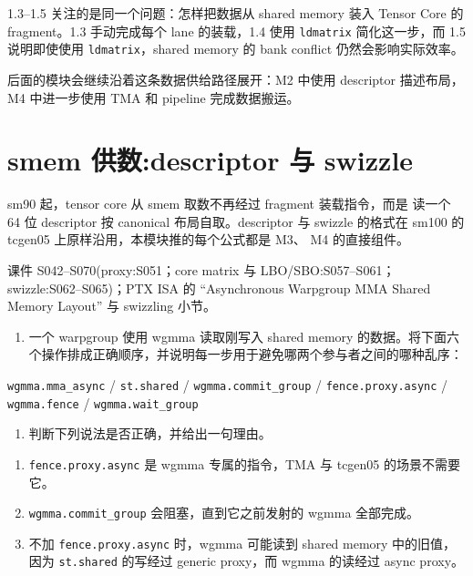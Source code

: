 \documentclass[11pt,a4paper,fontset=fandol]{ctexart}
\providecommand{\tightlist}{\setlength{\itemsep}{0pt}\setlength{\parskip}{0pt}}
\begin{document}
\begin{lookback}

1.3--1.5 关注的是同一个问题：怎样把数据从 shared memory 装入 Tensor Core
的 fragment。1.3 手动完成每个 lane 的装载，1.4 使用 \texttt{ldmatrix}
简化这一步，而 1.5 说明即使使用 \texttt{ldmatrix}，shared memory 的 bank
conflict 仍然会影响实际效率。

后面的模块会继续沿着这条数据供给路径展开：M2 中使用 descriptor
描述布局，M4 中进一步使用 TMA 和 pipeline 完成数据搬运。

\end{lookback}

\section{smem 供数:descriptor 与
swizzle}\label{smem-ux4f9bux6570descriptor-ux4e0e-swizzle}

sm90 起，tensor core 从 smem 取数不再经过 fragment 装载指令，而是 读一个
64 位 descriptor 按 canonical 布局自取。descriptor 与 swizzle 的格式在
sm100 的 tcgen05 上原样沿用，本模块推的每个公式都是 M3、 M4 的直接组件。

\begin{reading}

课件 S042--S070(proxy:S051；core matrix 与 LBO/SBO:S057--S061；
swizzle:S062--S065)；PTX ISA 的 ``Asynchronous Warpgroup MMA Shared
Memory Layout'' 与 swizzling 小节。

\end{reading}


\begin{enumerate}
\def\labelenumi{(\alph{enumi})}
\tightlist
\item
  一个 warpgroup 使用 wgmma 读取刚写入 shared memory
  的数据。将下面六个操作排成正确顺序，并说明每一步用于避免哪两个参与者之间的哪种乱序：
\end{enumerate}

\texttt{wgmma.mma\_async} / \texttt{st.shared} /
\texttt{wgmma.commit\_group} / \texttt{fence.proxy.async} /
\texttt{wgmma.fence} / \texttt{wgmma.wait\_group}

\begin{enumerate}
\def\labelenumi{(\alph{enumi})}
\setcounter{enumi}{1}
\tightlist
\item
  判断下列说法是否正确，并给出一句理由。
\end{enumerate}

\begin{enumerate}
\def\labelenumi{\arabic{enumi}.}
\tightlist
\item
  \texttt{fence.proxy.async} 是 wgmma 专属的指令，TMA 与 tcgen05
  的场景不需要它。
\item
  \texttt{wgmma.commit\_group} 会阻塞，直到它之前发射的 wgmma 全部完成。
\item
  不加 \texttt{fence.proxy.async} 时，wgmma 可能读到 shared memory
  中的旧值，因为 \texttt{st.shared} 的写经过 generic proxy，而 wgmma
  的读经过 async proxy。
\end{enumerate}
\end{document}
